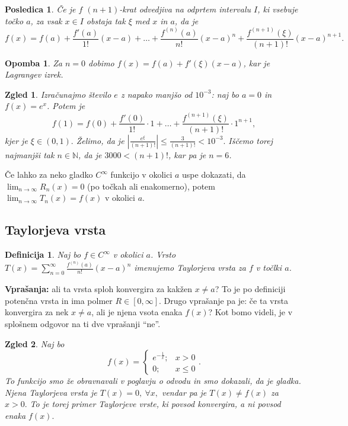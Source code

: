 \documentclass[10pt, a4paper]{article}
\newtheorem{posledica}[izr]{Posledica}
\newtheorem{defi}{Definicija}[section]
\newenvironment{noticeB}{%
  \tcolorbox[%
  notitle,
  empty,
  enhanced,  %
  breakable,
  coltext=black,
  colback=white, 
  fontupper=\rmfamily,
  parbox=false,
  noparskip,
  sharp corners,
  boxrule=-1pt,  %
  frame hidden,
  left=7pt,  %
  right=7pt,
  top=5pt,
  bottom=5pt,
  before skip=2.5ex plus 2pt,
  after skip=2.5ex plus 2pt,
  borderline west = {1.5pt}{-0.1pt}{blue!30!black}, %
  overlay unbroken and last={%
    \draw[color=black, line width=1.25pt]
    ($(frame.south west)+(1.pt, -0.1pt)$) -- ++(2em, 0);
  }
  ]}
{\endtcolorbox}
\newenvironment{definicija}{\begin{defi}\begin{noticeB}}{%
    \end{noticeB}\end{defi}}
\newtheorem*{opomba}{Opomba}
\newtheorem{zgled}{Zgled}[section]
\newcommand{\N}{\mathbb {N}}
\newcommand{\limzap}[1]{\lim_{n \to \infty} {#1}}
\begin{document}
\begin{posledica}
    Če je $f$ $(n+1)$-krat odvedjiva na odprtem intervalu $I$, ki vsebuje točko $a$,
    za vsak $x \in I$ obstaja tak $\xi$ med $x$ in $a$, da je 
    $$f(x) = f(a) + \frac{f'(a)}{1!} (x-a) + \dots + \frac{f^{(n)}(a)}{n!} (x-a)^n + \frac{f^{(n+1)}(\xi)}{(n+1)!} (x-a)^{n+1}.$$
\end{posledica}

\begin{opomba}
    Za $n = 0$ dobimo $f(x) = f(a) + f'(\xi) (x-a)$, kar je Lagrangev izrek.
\end{opomba}

\begin{zgled}
    Izračunajmo število $e$ z napako manjšo od $10^{-3}$:
    naj bo $a = 0$ in $f(x) = e^x$. Potem je 
    $$f(1) = f(0) + \frac{f'(0)}{1!}\cdot 1 + \dots + \frac{f^{(n+1)}(\xi)}{(n+1)!} \cdot 1^{n+1},$$
    kjer je $\xi \in (0, 1).$
    Želimo, da je $\left| \frac{e^\xi}{(n+1)!} \right| \leq \frac{3}{(n+1)!} <10^{-3}.$
    Iščemo torej najmanjši tak $n \in \N$, da je $3000 < (n+1)!$, kar pa je $n = 6$.
\end{zgled}

Če lahko za neko gladko $C^\infty$ funkcijo v okolici $a$ uspe dokazati, da $\limzap{R_n(x)} = 0$ (po točkah ali enakomerno),
potem $\limzap{T_n (x)} = f(x)$ v okolici $a$.

\subsection{Taylorjeva vrsta}

\begin{definicija}
    Naj bo $f \in C^{\infty}$ v okolici $a$.
    Vrsto $T(x) = \sum_{n=0} ^\infty \frac{f^{(n)} (a)}{n!} (x-a)^n$
    imenujemo Taylorjeva vrsta za $f$ v točlki $a$.
\end{definicija}

\textbf{Vprašanja:} ali ta vrsta sploh konvergira za kakžen $x \neq a$?
To je po definiciji potenčna vrsta in ima polmer $R \in [0, \infty]$.
Drugo vprašanje pa je: če ta vrsta konvergira za nek $x \neq a$, ali je njena vsota enaka $f(x)$?
Kot bomo videli, je v splošnem odgovor na ti dve vprašanji "`ne"'.

\begin{zgled}
    Naj bo $$f(x) = \begin{cases}
        e^{-\frac{1}{x}}; & x > 0\\
        0; & x \leq 0
    \end{cases}.$$
    To funkcijo smo že obravnavali v poglavju o odvodu in smo dokazali, da je gladka.
    Njena Taylorjeva vrsta je $T(x) = 0,\ \forall x,$
    vendar pa je $T(x) \neq f(x)$ za $x > 0.$
    To je torej primer Taylorjeve vrste, ki povsod konvergira, a ni povsod enaka $f(x).$
\end{zgled}
\end{document}
